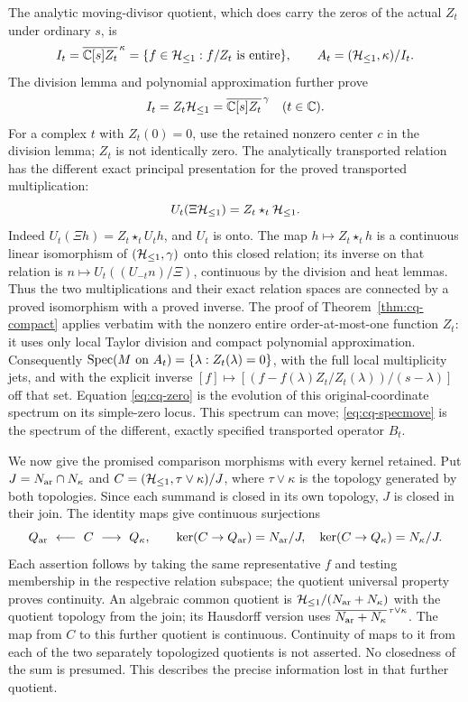 The analytic moving-divisor quotient, which does carry the zeros of
the actual $Z_t$ under ordinary $s$, is
\begin{equation}\label{eq:cq-divisor}
 I_t=\overline{\mathbb C[s]Z_t}^{\,\kappa}
 =\{f\in\mathcal H_{\leq 1}:f/Z_t\text{ is entire}\},\qquad
 A_t=(\mathcal H_{\leq 1},\kappa)/I_t.
\end{equation}
The division lemma and polynomial approximation further prove
\[
 I_t=Z_t\mathcal H_{\leq 1}=\overline{\mathbb C[s]Z_t}^{\,\gamma}\quad(t\in\mathbb C).
\]
For a complex $t$ with $Z_t(0)=0$, use the retained nonzero center
$c$ in the division lemma; $Z_t$ is not identically zero.
The analytically transported relation has the different exact
principal presentation for the proved transported multiplication:
\begin{equation}\label{eq:cq-starideal}
 U_t(\Xi\mathcal H_{\leq 1})=Z_t\star_t\mathcal H_{\leq 1}.
\end{equation}
Indeed $U_t(\Xi h)=Z_t\star_t U_th$, and $U_t$ is onto.
The map $h\mapsto Z_t\star_t h$ is a continuous linear
isomorphism of $(\mathcal H_{\leq 1},\gamma)$ onto this closed relation;
its inverse on that relation is
$n\mapsto U_t((U_{-t}n)/\Xi)$, continuous by the division and
heat lemmas. Thus the two multiplications and their exact relation
spaces are connected by a proved isomorphism with a proved inverse.
The proof of Theorem~\ref{thm:cq-compact} applies verbatim with
the nonzero entire order-at-most-one function $Z_t$: it uses only
local Taylor division and compact polynomial approximation.
Consequently $\operatorname{Spec}(M\text{ on }A_t)=\{\lambda:Z_t(\lambda)=0\}$,
with the full local multiplicity jets, and with the explicit inverse
$[f]\mapsto[(f-f(\lambda)Z_t/Z_t(\lambda))/(s-\lambda)]$
off that set. Equation \eqref{eq:cq-zero} is the evolution of this
original-coordinate spectrum on its simple-zero locus.
This spectrum can move; \eqref{eq:cq-specmove} is the spectrum
of the different, exactly specified transported operator $B_t$.

We now give the promised comparison morphisms with every kernel
retained. Put $J=N_{\rm ar}\cap N_\kappa$ and
$C=(\mathcal H_{\leq 1},\tau\vee\kappa)/J$, where $\tau\vee\kappa$ is the
topology generated by both topologies. Since each summand is closed
in its own topology, $J$ is closed in their join. The identity maps
give continuous surjections
\begin{equation}\label{eq:cq-span}
 Q_{\rm ar}\ \longleftarrow\ C\ \longrightarrow\ Q_\kappa,
 \qquad\ker(C\to Q_{\rm ar})=N_{\rm ar}/J,
 \quad\ker(C\to Q_\kappa)=N_\kappa/J.
\end{equation}
Each assertion follows by taking the same representative $f$ and
testing membership in the respective relation subspace; the quotient
universal property proves continuity. An algebraic common quotient is
$\mathcal H_{\leq 1}/(N_{\rm ar}+N_\kappa)$ with the quotient topology from the join;
its Hausdorff version uses
$\overline{N_{\rm ar}+N_\kappa}^{\,\tau\vee\kappa}$.
The map from $C$ to this further quotient is continuous. Continuity
of maps to it from each of the two separately topologized quotients
is not asserted. No closedness of the sum is presumed. This describes
the precise information lost in that further quotient.

